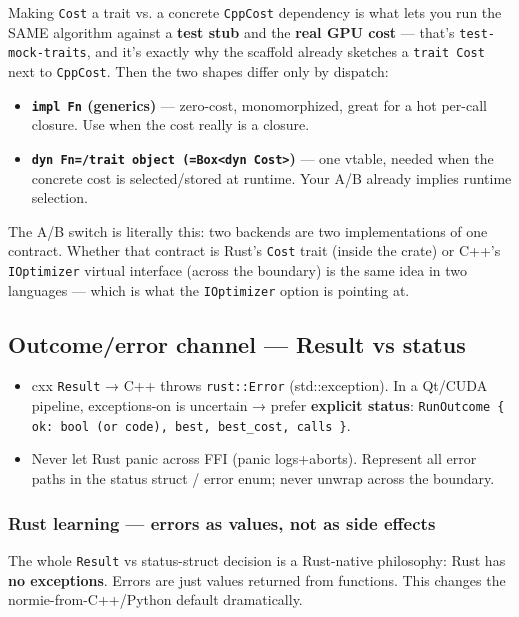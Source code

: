 \documentclass[11pt]{article}
\begin{document}
Making \texttt{Cost} a trait vs. a concrete \texttt{CppCost} dependency is what lets you run
the SAME algorithm against a \textbf{\textbf{test stub}} and the \textbf{\textbf{real GPU cost}} — that's
\texttt{test-mock-traits}, and it's exactly why the scaffold already sketches a
\texttt{trait Cost} next to \texttt{CppCost}. Then the two shapes differ only by dispatch:

\begin{itemize}
\item \textbf{\textbf{\texttt{impl Fn} (generics)}} — zero-cost, monomorphized, great for a hot
per-call closure. Use when the cost really is a closure.
\item \textbf{\textbf{\texttt{dyn Fn=/trait object (=Box<dyn Cost>})}} — one vtable, needed when the
concrete cost is selected/stored at runtime. Your A/B already implies runtime
selection.
\end{itemize}

The A/B switch is literally this: two backends are two implementations of one
contract. Whether that contract is Rust's \texttt{Cost} trait (inside the crate) or
C++'s \texttt{IOptimizer} virtual interface (across the boundary) is the same idea in
two languages — which is what the \texttt{IOptimizer} option is pointing at.
\subsection{Outcome/error channel — Result vs status}
\label{sec:orgab86884}

\begin{itemize}
\item cxx \texttt{Result} → C++ throws \texttt{rust::Error} (std::exception). In a Qt/CUDA
pipeline, exceptions-on is uncertain → prefer \textbf{\textbf{explicit status}}:
\texttt{RunOutcome \{ ok: bool (or code), best, best\_cost, calls \}}.
\item Never let Rust panic across FFI (panic logs+aborts). Represent all error
paths in the status struct / error enum; never unwrap across the boundary.
\end{itemize}
\subsubsection{Rust learning — errors as values, not as side effects}
\label{sec:org647247e}

The whole \texttt{Result} vs status-struct decision is a Rust-native philosophy: Rust
has \textbf{\textbf{no exceptions}}. Errors are just values returned from functions. This
changes the normie-from-C++/Python default dramatically.
\end{document}
